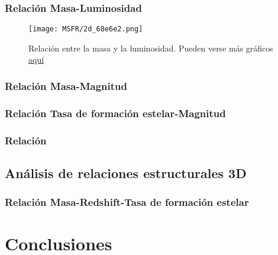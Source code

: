 \documentclass[11pt, a4paper]{article} %
\begin{document}
\subsubsection{Relación Masa-Luminosidad}

\begin{figure}[H]
    \centering
    \texttt{[image: MSFR/2d\_68e6e2.png]}
    \caption{Relación entre la masa y la luminosidad. Pueden verse más gráficos \href{URL}{aquí}}
    \label{fig:LM}
\end{figure}
\subsubsection{Relación Masa-Magnitud}
\subsubsection{Relación Tasa de formación estelar-Magnitud}
\subsubsection{Relación }
\subsection{Análisis de relaciones estructurales 3D}
\subsubsection{Relación Masa-Redshift-Tasa de formación estelar}
\section{Conclusiones}


\printbibliography

\end{document}
